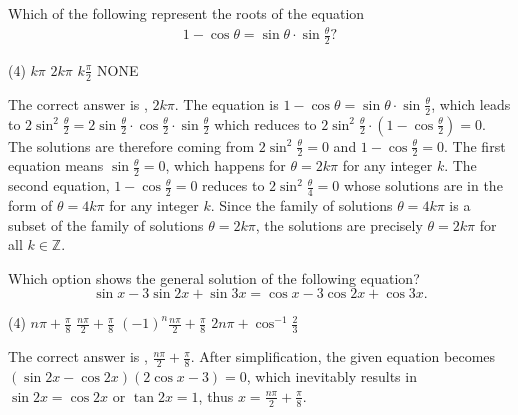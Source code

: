\begin{question}[name=2004 Orissa JEE]
    Which of the following represent the roots of the equation
    \begin{align*}
        1 - \cos \theta = \sin \theta \cdot \sin \frac{\theta}{2}?
    \end{align*}
    \begin{tasks}(4)
        \task $k\pi$
        \task \correct $2k\pi$
        \task $\displaystyle k\frac{\pi}{2}$
        \task NONE
    \end{tasks}
\end{question}
\begin{solution}
    The correct answer is \correct, $2k\pi$. The equation is $1 - \cos \theta = \sin \theta \cdot \sin \frac{\theta}{2}$, which leads to $2\sin^2 \frac{\theta}{2} = 2\sin \frac{\theta}{2} \cdot \cos \frac{\theta}{2} \cdot \sin \frac{\theta}{2}$ which reduces to $2\sin^2 \frac{\theta}{2} \cdot (1-\cos \frac{\theta}{2})=0$. The solutions are therefore coming from $2\sin^2 \frac{\theta}{2}=0$ and $1-\cos\frac{\theta}{2} =0$. The first equation means $\sin \frac{\theta}{2}=0$, which happens for $\theta = 2k\pi$ for any integer $k$. The second equation, $1 - \cos \frac{\theta}{2}=0$ reduces to $2\sin^2\frac{\theta}{4}=0$ whose solutions are in the form of $\theta = 4k\pi$ for any integer $k$. Since the family of solutions $\theta=4k\pi$ is a subset of the family of solutions $\theta=2k\pi$, the solutions are precisely $\theta=2k\pi$ for all $k\in\mathbb Z$.
\end{solution}


\begin{question}[name=1989 IIT]
    Which option shows the general solution of the following equation?
    $$\sin x - 3 \sin 2x + \sin 3x =\cos x - 3 \cos 2x + \cos 3x.$$
    \begin{tasks}(4)
        \task $\displaystyle n\pi+ \frac{\pi}{8}$
        \task \correct $\displaystyle \frac{n\pi}{2}+ \frac{\pi}{8}$
        \task $\displaystyle (-1)^n\frac{n\pi}{2}+ \frac{\pi}{8}$
        \task $\displaystyle 2n\pi+ \cos^{-1}\frac{2}{3}$
    \end{tasks}
\end{question}
\begin{solution}
    The correct answer is \correct, $\frac{n\pi}{2}+ \frac{\pi}{8}$. After simplification, the given equation becomes $(\sin 2x - \cos 2x)(2\cos x - 3)=0$, which inevitably results in $\sin 2x = \cos 2x$ or $\tan 2x = 1$, thus $x=\frac{n\pi}{2}+ \frac{\pi}{8}$.
\end{solution}



